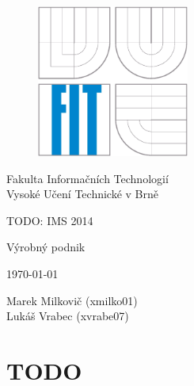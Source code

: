 \documentclass[12pt,a4paper,titlepage,final]{article}
\begin{document}
\def\projname{TODO: IMS 2014}

\begin{titlepage}

\begin{figure}[!h]
\centering
    \includegraphics[height=5cm]{doc/logo.eps}
\end{figure}
\center Fakulta Informačních Technologií \\
\center Vysoké Učení Technické v Brně \\

\vfill

\begin{center}
\bigskip
\begin{Huge}
\projname\\
\end{Huge}
\begin{large}
Výrobný podnik\\
\end{large}
\end{center}

\vfill

\begin{center}
\begin{Large}
\today
\end{Large}
\end{center}

\vfill

\begin{flushleft}
\begin{large}
Marek Milkovič (xmilko01) \\
Lukáš Vrabec (xvrabe07)
\end{large}
\end{flushleft}
\end{titlepage}

\pagestyle{plain}
\tableofcontents

\newpage
\pagestyle{plain}
\setcounter{page}{1}

\section{TODO}
\end{document}
